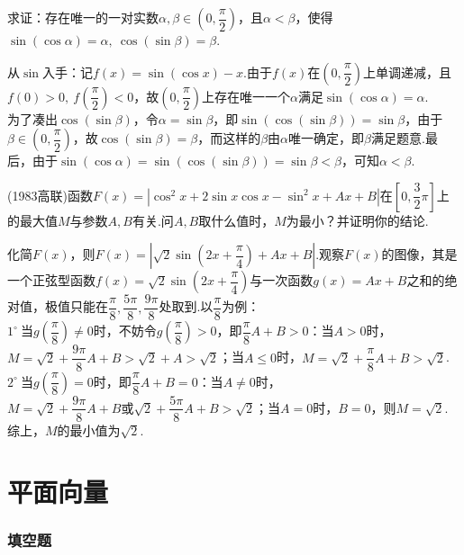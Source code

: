 \documentclass[cn,hazy,black,10pt,normal]{elegantnote}
\newcommand{\ssb}[1]{\left( #1 \right)}
\newcommand{\buzhou}[1]{$#1^{\circ} \ $}
\begin{document}
\begin{problem}
	求证：存在唯一的一对实数$\alpha ,\beta \in \ssb{0,\dfrac{\pi}{2}}$，且$\alpha < \beta$，使得$\sin (\cos \alpha )=\alpha ,~\cos (\sin \beta )=\beta $.
\end{problem}
\begin{solution}
	从$\sin$入手：记$f(x)=\sin (\cos x )-x$.由于$f(x)$在$\ssb{0,\dfrac{\pi}{2}}$上单调递减，且$f(0)>0,~f \ssb{\dfrac{\pi}{2}}<0$，故$\ssb{0,\dfrac{\pi}{2}}$上存在唯一一个$\alpha$满足$\sin (\cos \alpha )=\alpha$. \\
	为了凑出$\cos (\sin \beta )$，令$\alpha = \sin \beta $，即$\sin (\cos (\sin \beta ) )=\sin \beta $，由于$\beta \in \ssb{0,\dfrac{\pi}{2}}$，故$\cos (\sin \beta )=\beta$，而这样的$\beta $由$\alpha $唯一确定，即$\beta $满足题意.最后，由于$\sin (\cos \alpha )=\sin (\cos (\sin \beta))=\sin \beta < \beta$，可知$\alpha < \beta$.
\end{solution}

\begin{problem}
	(1983高联)函数$F(x)=|\cos ^2 x+2\sin x \cos x - \sin ^2 x + Ax + B|$在$\left[ 0,\dfrac{3}{2}\pi \right]$上的最大值$M$与参数$A,B$有关.问$A,B$取什么值时，$M$为最小？并证明你的结论.
\end{problem}
\begin{solution}
	化简$F(x)$，则$F(x)=|\sqrt{2}\sin \ssb{2x+\dfrac{\pi}{4}}+Ax+B |$.观察$F(x)$的图像，其是一个正弦型函数$f(x)=\sqrt{2}\sin \ssb{2x+\dfrac{\pi}{4}}$与一次函数$g(x)=Ax+B$之和的绝对值，极值只能在$\dfrac{\pi}{8},\dfrac{5\pi}{8},\dfrac{9\pi}{8}$处取到.以$\dfrac{\pi}{8}$为例： \\
	\buzhou{1}当$g \ssb{\dfrac{\pi}{8}} \neq 0$时，不妨令$g \ssb{\dfrac{\pi}{8}} > 0$，即$\dfrac{\pi}{8}A+B>0$：当$A>0$时，$M=\sqrt{2}+\dfrac{9\pi}{8}A+B>\sqrt{2}+A>\sqrt{2}$；当$A \leq 0$时，$M=\sqrt{2}+\dfrac{\pi}{8}A+B>\sqrt{2}$. \\
	\buzhou{2}当$g \ssb{\dfrac{\pi}{8}} = 0$时，即$\dfrac{\pi}{8}A+B=0$：当$A \neq 0$时，$M=\sqrt{2}+\dfrac{9\pi}{8}A+B \text{或} \sqrt{2}+\dfrac{5\pi}{8}A+B>\sqrt{2}$；当$A = 0$时，$B=0$，则$M=\sqrt{2}$. \\
	综上，$M$的最小值为$\sqrt{2}$.
\end{solution}

\chapter{平面向量}

\subsection*{填空题}
\end{document}
